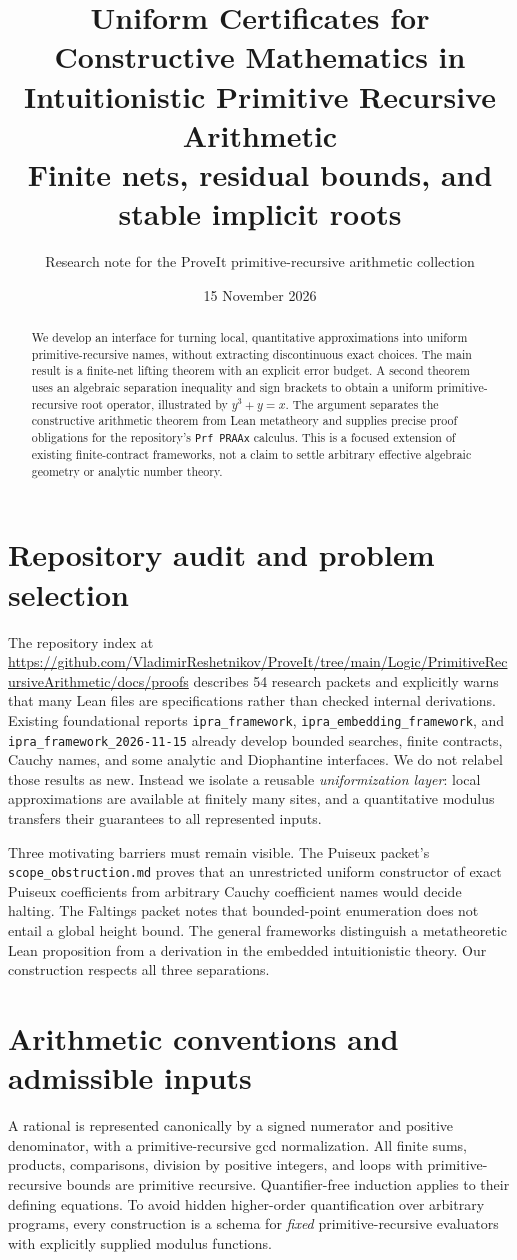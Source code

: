 \documentclass[11pt]{article}
\title{Uniform Certificates for Constructive Mathematics in Intuitionistic Primitive Recursive Arithmetic\\\large Finite nets, residual bounds, and stable implicit roots}
\author{Research note for the ProveIt primitive-recursive arithmetic collection}
\date{15 November 2026}
\begin{document}
\maketitle
\begin{abstract}
We develop an interface for turning local, quantitative approximations into uniform primitive-recursive names, without extracting discontinuous exact choices. The main result is a finite-net lifting theorem with an explicit error budget. A second theorem uses an algebraic separation inequality and sign brackets to obtain a uniform primitive-recursive root operator, illustrated by $y^3+y=x$. The argument separates the constructive arithmetic theorem from Lean metatheory and supplies precise proof obligations for the repository's \texttt{Prf PRAAx} calculus. This is a focused extension of existing finite-contract frameworks, not a claim to settle arbitrary effective algebraic geometry or analytic number theory.
\end{abstract}
\tableofcontents
\section{Repository audit and problem selection}
The repository index at \url{https://github.com/VladimirReshetnikov/ProveIt/tree/main/Logic/PrimitiveRecursiveArithmetic/docs/proofs} describes 54 research packets and explicitly warns that many Lean files are specifications rather than checked internal derivations. Existing foundational reports \texttt{ipra\_framework}, \texttt{ipra\_embedding\_framework}, and \texttt{ipra\_framework\_2026-11-15} already develop bounded searches, finite contracts, Cauchy names, and some analytic and Diophantine interfaces. We do not relabel those results as new. Instead we isolate a reusable \emph{uniformization layer}: local approximations are available at finitely many sites, and a quantitative modulus transfers their guarantees to all represented inputs.

Three motivating barriers must remain visible. The Puiseux packet's \texttt{scope\_obstruction.md} proves that an unrestricted uniform constructor of exact Puiseux coefficients from arbitrary Cauchy coefficient names would decide halting. The Faltings packet notes that bounded-point enumeration does not entail a global height bound. The general frameworks distinguish a metatheoretic Lean proposition from a derivation in the embedded intuitionistic theory. Our construction respects all three separations.

\section{Arithmetic conventions and admissible inputs}
A rational is represented canonically by a signed numerator and positive denominator, with a primitive-recursive gcd normalization. All finite sums, products, comparisons, division by positive integers, and loops with primitive-recursive bounds are primitive recursive. Quantifier-free induction applies to their defining equations. To avoid hidden higher-order quantification over arbitrary programs, every construction is a schema for \emph{fixed} primitive-recursive evaluators with explicitly supplied modulus functions.
\end{document}
